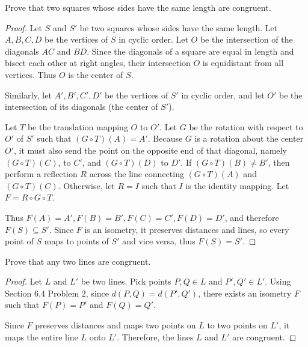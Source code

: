 \begin{tcolorbox}[title=Problem 3, breakable]
    Prove that two squares whose sides have the 
        same length are congruent.
\end{tcolorbox}

\begin{proof}
    Let $S$ and $S'$ be two squares whose sides have the same length.
    Let $A, B, C, D$ be the vertices of $S$ in cyclic order.
    Let $O$ be the intersection of the diagonals $AC$ and $BD$.
    Since the diagonals of a square are equal in length and bisect each other
        at right angles, their intersection $O$ is equidistant from all vertices.
    Thus $O$ is the center of $S$.

    Similarly, let $A', B', C', D'$ be the vertices of $S'$ in cyclic order,
    and let $O'$ be the intersection of its diagonals (the center of $S'$).

    Let $T$ be the translation mapping $O$ to $O'$.
    Let $G$ be the rotation with respect to $O'$
        of $S'$ such that $(G \circ T)(A) = A'$.
    Because $G$ is a rotation about the center $O'$, it must also send 
        the point on the opposite end of that diagonal, namely $(G\circ T)(C)$, to $C'$, 
        and $(G\circ T)(D)$ to $D'$.
    If $(G \circ T)(B) \neq B'$, then perform  
        a reflection $R$ across the line connecting $(G \circ T)(A)$ and $(G \circ T)(C)$.
    Otherwise, let $R = I$ such that $I$ is the identity mapping.
    Let $F = R \circ G \circ T$.

    Thus $F(A) = A', F(B) = B', F(C) = C', F(D) = D'$, 
        and therefore $F(S) \subseteq S'$.
    Since $F$ is an isometry, it preserves distances and lines, so 
    every point of $S$ maps to points of $S'$ and vice versa, thus $F(S) = S'$.
\end{proof}

\begin{tcolorbox}[title=Problem 4, breakable]
    Prove that any two lines are congruent.
\end{tcolorbox}


\begin{proof}
    Let $L$ and $L'$ be two lines. Pick points $P, Q \in L$ and $P', Q' \in L'$.  
    Using Section $6.4$ Problem $2$, since $d(P,Q) = d(P',Q')$, there exists an isometry $F$ such that $F(P) = P'$ and $F(Q) = Q'$.  

    Since $F$ preserves distances and maps two points on $L$ to two points on $L'$, it maps the entire line $L$ onto $L'$.  
    Therefore, the lines $L$ and $L'$ are congruent.
\end{proof}

